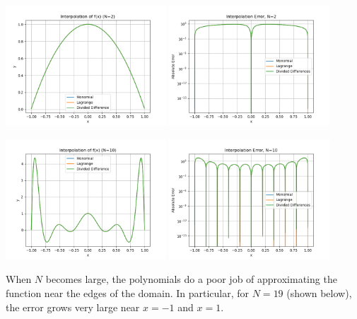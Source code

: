 \documentclass[10pt]{article}
\begin{document}
\begin{center}
  \includegraphics[width=0.45\textwidth]{lab7_interp_N2.png}
  \includegraphics[width=0.45\textwidth]{lab7_interp_error_N2.png}

  \includegraphics[width=0.45\textwidth]{lab7_interp_N10.png}
  \includegraphics[width=0.45\textwidth]{lab7_interp_error_N10.png}
\end{center}

When \(N\) becomes large, the polynomials do a poor job of approximating the function near the edges of the domain. In particular, for \(N=19\) (shown below), the error grows very large near \(x=-1\) and \(x=1\). 
\end{document}
